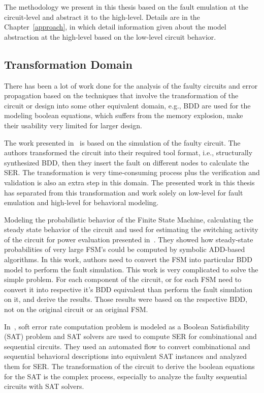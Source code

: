 The methodology we present in this thesis based on the fault emulation at the circuit-level and abstract it to the high-level. Details are in the Chapter~\ref{approach}, in which detail information given about the model abstraction at the high-level based on the low-level circuit behavior.


\subsection{Transformation Domain}



There has been a lot of work done for the analysis of the faulty circuits and error propagation based on the techniques that involve the transformation of the circuit or design into some other equivalent domain, e.g., BDD are used for the modeling boolean equations, which suffers from the memory explosion, make their usability very limited for larger design.

The work presented in~\citep{ubar2014modeling} is based on the simulation of the faulty circuit.  The authors transformed the circuit into their required tool format, i.e., structurally synthesized BDD, then they
insert the fault on different nodes to calculate the SER.  The transformation is very time-consuming process plus the verification and validation is also an extra step in this domain. The presented work in this thesis has separated from this transformation and work solely on low-level for fault emulation and high-level for behavioral modeling.


Modeling the probabilistic behavior of the Finite State Machine, calculating the steady state
behavior of the circuit and used for estimating the switching activity of the circuit for
power evaluation presented in~\citep{hachtel1996markovian}. They showed how steady-state probabilities of very large FSM’s could be computed by
symbolic ADD-based algorithms. In this work, authors need to convert the FSM into particular BDD model to perform the fault simulation. This work is very complicated to solve the simple problem.  For each component of the circuit, or for each FSM need to convert it into respective it's BDD equivalent than perform the fault simulation on it, and derive the results. Those results were based on the respective BDD, not on the original circuit or an original FSM.

In~\citep{shazli2011high}, soft error rate  computation problem is modeled as a Boolean
Satisfiability (SAT) problem and SAT solvers are used to compute SER for combinational and
sequential circuits. They used an automated flow to convert combinational and sequential behavioral
descriptions into equivalent SAT instances and analyzed them for SER. The transformation of the circuit to derive the boolean equations for the SAT is the complex process, especially to analyze the faulty sequential circuits with SAT solvers.





